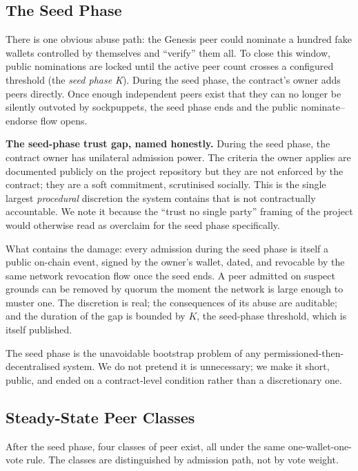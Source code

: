 \documentclass[11pt,a4paper]{article}
\begin{document}
\subsection{The Seed Phase}

There is one obvious abuse path: the Genesis peer could
nominate a hundred fake wallets controlled by themselves and
``verify'' them all. To close this window, public nominations
are locked until the active peer count crosses a configured
threshold (the \emph{seed phase K}). During the seed phase, the
contract's owner adds peers directly. Once enough independent
peers exist that they can no longer be silently outvoted by
sockpuppets, the seed phase ends and the public
nominate--endorse flow opens.

\begin{notebox}
\textbf{The seed-phase trust gap, named honestly.} During the
seed phase, the contract owner has unilateral admission power.
The criteria the owner applies are documented publicly on the
project repository but they are not enforced by the contract;
they are a soft commitment, scrutinised socially. This is the
single largest \emph{procedural} discretion the system contains
that is not contractually accountable. We note it because the
``trust no single party'' framing of the project would
otherwise read as overclaim for the seed phase specifically.

What contains the damage: every admission during the seed phase
is itself a public on-chain event, signed by the owner's
wallet, dated, and revocable by the same network revocation
flow once the seed ends. A peer admitted on suspect grounds can
be removed by quorum the moment the network is large enough to
muster one. The discretion is real; the consequences of its
abuse are auditable; and the duration of the gap is bounded by
$K$, the seed-phase threshold, which is itself published.
\end{notebox}

The seed phase is the unavoidable bootstrap problem of any
permissioned-then-decentralised system. We do not pretend it is
unnecessary; we make it short, public, and ended on a
contract-level condition rather than a discretionary one.

\subsection{Steady-State Peer Classes}

After the seed phase, four classes of peer exist, all under the
same one-wallet-one-vote rule. The classes are distinguished by
admission path, not by vote weight.
\end{document}
